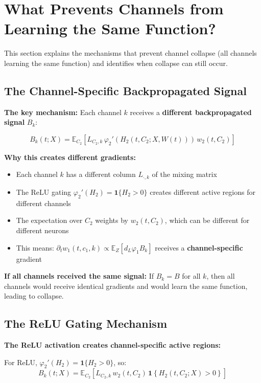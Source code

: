 \section{What Prevents Channels from Learning the Same Function?}
\label{sec:channel-collapse-prevention}

This section explains the mechanisms that prevent channel collapse (all channels learning the same function) and identifies when collapse can still occur.

\subsection{The Channel-Specific Backpropagated Signal}

\textbf{The key mechanism:} Each channel $k$ receives a \textbf{different backpropagated signal} $B_k$:

\[
B_k(t; X) = \mathbb{E}_{C_2}\left[L_{C_2,k}\,\varphi_2'(H_2(t, C_2; X, W(t)))\,w_2(t, C_2)\right]
\]

\textbf{Why this creates different gradients:}
\begin{itemize}
\item Each channel $k$ has a different column $L_{\cdot,k}$ of the mixing matrix
\item The ReLU gating $\varphi_2'(H_2) = \mathbf{1}\{H_2 > 0\}$ creates different active regions for different channels
\item The expectation over $C_2$ weights by $w_2(t, C_2)$, which can be different for different neurons
\item This means: $\partial_t w_1(t, c_1, k) \propto \mathbb{E}_Z[d_L \varphi_1 B_k]$ receives a \textbf{channel-specific} gradient
\end{itemize}

\textbf{If all channels received the same signal:} If $B_k = B$ for all $k$, then all channels would receive identical gradients and would learn the same function, leading to collapse.

\subsection{The ReLU Gating Mechanism}

\textbf{The ReLU activation creates channel-specific active regions:}

For ReLU, $\varphi_2'(H_2) = \mathbf{1}\{H_2 > 0\}$, so:
\[
B_k(t; X) = \mathbb{E}_{C_2}\left[L_{C_2,k}\,w_2(t, C_2)\,\mathbf{1}\left\{H_2(t, C_2; X) > 0\right\}\right]
\]

